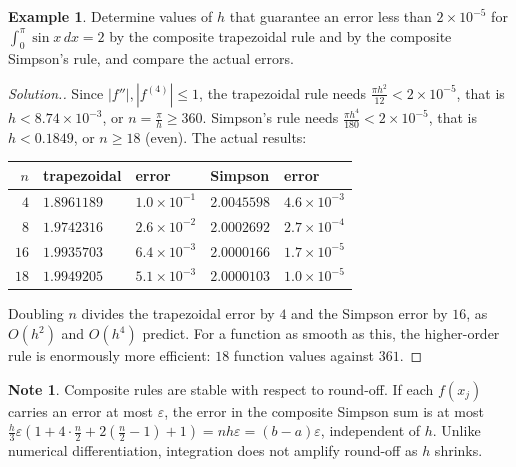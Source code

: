 \documentclass[11pt,a4paper]{article}
\numberwithin{equation}{section}
\theoremstyle{definition}
\newtheorem{exa}[thm]{Example}
\newtheorem*{note}{Note}
\newenvironment{solution}
  {\renewcommand{\qedsymbol}{}\begin{proof}[\textit{Solution}.]}
  {\end{proof}}
\begin{document}
\begin{exa}
\label{exa:composite}
Determine values of $h$ that guarantee an error less than $2\times10^{-5}$ for $\int_0^\pi\sin x\,dx = 2$ by the composite trapezoidal rule
and by the composite Simpson's rule, and compare the actual errors.
\end{exa}

\begin{solution}
Since $|f''|,|f^{(4)}|\leq1$, the trapezoidal rule needs $\frac{\pi h^2}{12}<2\times10^{-5}$, that is $h<8.74\times10^{-3}$, or $n = \frac\pi h\geq360$.
Simpson's rule needs $\frac{\pi h^4}{180}<2\times10^{-5}$, that is $h<0.1849$, or $n\geq18$ (even). The actual results:
\begin{center}
\begin{tabular}{rllll}
\hline
$n$ & trapezoidal & error & Simpson & error\\
\hline
$4$ & $1.8961189$ & $1.0\times10^{-1}$ & $2.0045598$ & $4.6\times10^{-3}$\\
$8$ & $1.9742316$ & $2.6\times10^{-2}$ & $2.0002692$ & $2.7\times10^{-4}$\\
$16$ & $1.9935703$ & $6.4\times10^{-3}$ & $2.0000166$ & $1.7\times10^{-5}$\\
$18$ & $1.9949205$ & $5.1\times10^{-3}$ & $2.0000103$ & $1.0\times10^{-5}$\\
\hline
\end{tabular}
\end{center}
Doubling $n$ divides the trapezoidal error by $4$ and the Simpson error by $16$, as $O(h^2)$ and $O(h^4)$ predict. For a function as smooth
as this, the higher-order rule is enormously more efficient: $18$ function values against $361$.
\end{solution}

\begin{note}
Composite rules are stable with respect to round-off. If each $f(x_j)$ carries an error at most $\varepsilon$, the error in the composite
Simpson sum is at most $\frac h3\varepsilon\left(1+4\cdot\frac n2+2(\frac n2-1)+1\right) = nh\varepsilon = (b-a)\varepsilon$, independent of $h$. Unlike
numerical differentiation, integration does not amplify round-off as $h$ shrinks.
\end{note}
\end{document}
